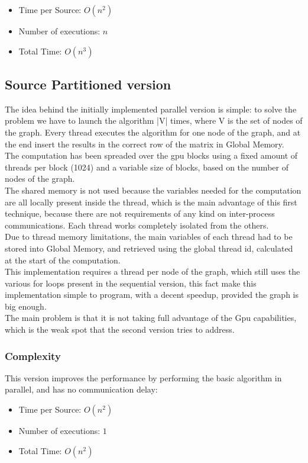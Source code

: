 \documentclass[
	a4paper, %
	12pt, %
]{class}
\begin{document}
\begin{itemize}
    \item Time per Source: $O(n^2)$
    \item Number of executions: $n$
    \item Total Time: $O(n^3)$\\
\end{itemize}

\subsection{Source Partitioned version}
The idea behind the initially implemented parallel version is simple:
to solve the problem we have to launch the algorithm |V| times, where V is the set of nodes of the graph.
Every thread executes the algorithm for one node of the graph, and at the end insert the results in the correct
row of the matrix in Global Memory.\\

The computation has been spreaded over the gpu blocks using a fixed amount of threads per block (1024) and
a variable size of blocks, based on the number of nodes of the graph. \\

The shared memory is not used because the variables needed for the computation are all locally present inside the thread, which is the main advantage of
this first technique, because there are not requirements of any kind on inter-process communications. Each thread works completely isolated from the others.\\

Due to thread memory limitations, the main variables of each thread had to be stored into Global Memory, and retrieved using the global thread id, calculated
at the start of the computation.\\

This implementation requires a thread per node of the graph, which still uses the various for loops present in the sequential version,
this fact make this implementation simple to program, with a decent speedup, provided the graph is big enough.\\
The main problem is that it is not taking full advantage of the Gpu capabilities, which is the weak spot that the second version tries to address.

\subsubsection{Complexity}
This version improves the performance by performing the basic algorithm in parallel, and has no communication delay:\\
\begin{itemize}
    \item Time per Source: $O(n^2)$
    \item Number of executions: $1$
    \item Total Time: $O(n^2)$\\
\end{itemize}
\end{document}
